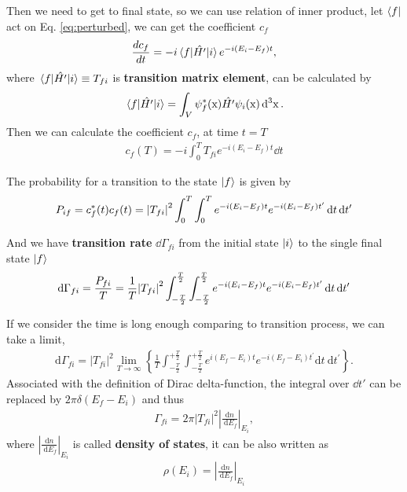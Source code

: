 Then we need to get to final state, so we can use relation of inner product, let $\bra{f}$ act on Eq. \ref{eq:perturbed}, we can get the coefficient $c_{f}$
\begin{align}
    \frac{d c_{f}}{dt}=-i\matrixel{f}{\hat{H'}}{i}e^{-i(E_{i}-E_{f})t},\label{eq:one_order}
\end{align}
where $\matrixel{f}{\hat{H'}}{i}\equiv T_{fi}$ is \textbf{transition matrix element}, can be calculated by
\begin{align}
    \matrixel{f}{\hat{H'}}{i}=\int_{V}\psi^{*}_{f}(\mathrm{x})\hat{H'}\psi_{i}(\mathrm{x})\dd[3]{\mathrm{x}}.
\end{align}
Then we can calculate the coefficient $c_{f}$, at time $t=T$
\begin{align}
    c_{f}(T)=-i\int^{T}_{0}T_{fi}e^{-i(E_{i}-E_{f})t}\dd{t}
\end{align}

The probability for a transition to the state $\ket{f}$ is given by
\begin{align}
    P_{if}=c_{f}^{*}(t)c_{f}(t)=\abs{T_{fi}}^{2}\int^{T}_0\int^{T}_0 e^{-i(E_{i}-E_{f})t}e^{-i(E_{i}-E_{f})t'}\dd{t}\dd{t'}
\end{align}

And we have \textbf{transition rate} $\dd{\Gamma_{fi}}$ from the initial state $\ket{i}$ to the single final state $\ket{f}$ 
\begin{align}
    \dd{\Gamma_{fi}}=\frac{P_{fi}}{T}=\frac{1}{T}\abs{T_{fi}}^{2}\int^{\frac{T}{2}}_{-\frac{T}{2}}\int^{\frac{T}{2}}_{-\frac{T}{2}} e^{-i(E_{i}-E_{f})t}e^{-i(E_{i}-E_{f})t'}\dd{t}\dd{t'}
\end{align}

If we consider the time is long enough comparing to transition process, we can take a limit,
\begin{align}
    \mathrm{d} \Gamma_{f i}=\left|T_{f i}\right|^2 \lim _{T \rightarrow \infty}\left\{\frac{1}{T} \int_{-\frac{T}{2}}^{+\frac{T}{2}} \int_{-\frac{T}{2}}^{+\frac{T}{2}} e^{i\left(E_f-E_i\right) t} e^{-i\left(E_f-E_i\right) t^{\prime}} \mathrm{d} t \mathrm{~d} t^{\prime}\right\}.
\end{align}
Associated with the definition of Dirac delta-function, the integral over $\dd t'$ can be replaced by $2\pi \delta(E_{f} -E_{i})$ and thus
\begin{align}
    \Gamma_{f i}  =2 \pi\left|T_{f i}\right|^2\left|\frac{\mathrm{d} n}{\mathrm{~d} E_f}\right|_{E_i},
\end{align}
where $\left|\frac{\mathrm{d} n}{\mathrm{~d} E_f}\right|_{E_i}$ is called \textbf{density of states}, it can be also written as 
\begin{align}
    \rho(E_{i})=\left|\frac{\mathrm{d} n}{\mathrm{~d} E_f}\right|_{E_i}
\end{align}

